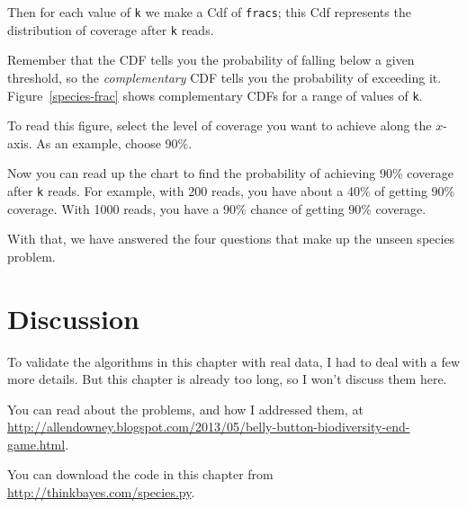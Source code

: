 \documentclass[12pt]{book}
\begin{document}
Then for each value of {\tt k} we make a Cdf of {\tt fracs}; this Cdf
represents the distribution of coverage after {\tt k} reads.

Remember that the CDF tells you the probability of falling below a
given threshold, so the {\em complementary} CDF tells you the
probability of exceeding it.  Figure~\ref{species-frac} shows
complementary CDFs for a range of values of {\tt k}.

To read this figure, select the level of coverage you want to achieve
along the $x$-axis.  As an example, choose 90\%.

Now you can read up the chart to find the probability of achieving
90\% coverage after {\tt k} reads.  For example, with 200 reads,
you have about a 40\% of getting 90\% coverage.  With 1000 reads, you
have a 90\% chance of getting 90\% coverage.

With that, we have answered the four questions that make up the unseen
species problem.  


\section{Discussion}

To validate the algorithms in this chapter with
real data, I had to deal with a few more details.  But
this chapter is already too long, so I won't discuss them here.

You can read about the problems, and how I addressed them, at
\url{http://allendowney.blogspot.com/2013/05/belly-button-biodiversity-end-game.html}.

You can download the code in this chapter from
\url{http://thinkbayes.com/species.py}.










\end{document}
